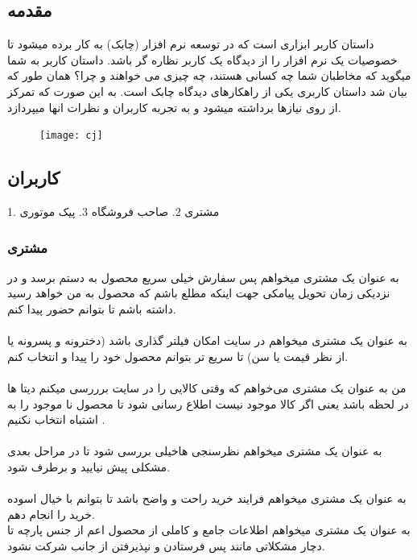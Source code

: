 \documentclass[12pt,onecolumn,a4paper]{article}
\begin{document}
\subsection{مقدمه} 
داستان کاربر ابزاری است که در توسعه نرم افزار (چابک) به کار برده میشود تا خصوصیات یک نرم افزار را از دیدگاه یک کاربر نظاره گر باشد. داستان کاربر به شما میگوید که مخاطبان شما چه کسانی هستند، چه چیزی می خواهند و چرا؟
همان طور که بیان شد داستان کاربری یکی از راهکارهای دیدگاه چابک است. به این صورت که تمرکز از روی نیازها برداشته میشود و به تجربه کاربران و نظرات انها میپردازد.\\
\begin{figure}[h]

\texttt{[image: cj]}
\end{figure}

\subsection{ کاربران }
 1. مشتری 2. صاحب فروشگاه 3. پیک موتوری

\subsubsection{ مشتری }

به عنوان یک مشتری میخواهم پس سفارش خیلی سریع محصول به دستم برسد و در نزدیکی زمان تحویل  پیامکی جهت اینکه مطلع باشم که محصول به من خواهد رسید داشته باشم تا بتوانم حضور پیدا کنم.\\
\\
	

به عنوان یک مشتری میخواهم در سایت امکان فیلتر گذاری باشد (دخترونه و پسرونه یا از نظر قیمت یا سن) تا سریع تر بتوانم محصول خود را پیدا و انتخاب کنم.\\
\\


من به عنوان یک مشتری می‌خواهم که وقتی کالایی را در سایت برررسی میکنم دیتا ها   در لحظه باشد یعنی اگر کالا موجود نیست اطلاع رسانی شود تا محصول نا موجود را به اشتباه انتخاب نکنیم .\\
\\


به عنوان یک مشتری میخواهم نظرسنجی هاخیلی بررسی شود تا در مراحل بعدی مشکلی پیش نیایید و برطرف شود.\\
\\


به عنوان یک مشتری میخواهم فرایند خرید راحت و واضح باشد تا بتوانم با خیال اسوده خرید را انجام دهم.\\


به عنوان یک مشتری میخواهم اطلاعات جامع و کاملی از محصول اعم از جنس پارچه تا دچار مشکلاتی مانند پس فرستادن و نپذیرفتن از جانب شرکت نشود.\\
\\
\end{document}
